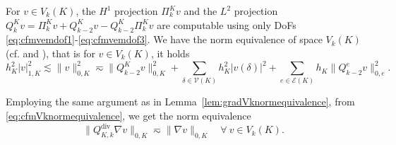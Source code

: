 \documentclass[10pt]{amsart}
\renewcommand{\div}{\operatorname{div}}
\numberwithin{equation}{section}
\begin{document}


For $v\in V_k(K)$, the $H^1$ projection $\Pi_k^Kv$ and the $L^2$ projection $Q_k^Kv= \Pi_k^Kv + Q_{k-2}^Kv-Q_{k-2}^K\Pi_k^Kv$ are computable using only DoFs \eqref{eq:cfmvemdof1}-\eqref{eq:cfmvemdof3}. 
We have the norm equivalence of space $V_k(K)$ (cf. \cite[Lemma 4.7]{Huang2021} and \cite{ChenHuang2018,BrennerSung2018,BeiraodaVeigaLovadinaRusso2017}), that is for $v\in V_k(K)$, it holds
\begin{equation}\label{eq:cfmVknormequivalence}
h_K^2|v|_{1,K}^2\lesssim\|v\|_{0,K}^2\eqsim \|Q_{k-2}^Kv\|_{0,K}^2 + \sum_{\delta\in \mathcal V(K)}h_K^2|v(\delta)|^2+\sum_{e\in\mathcal E(K)}h_K\|Q_{k-2}^ev\|_{0,e}^2.
\end{equation}

Employing the same argument as in Lemma~\ref{lem:gradVknormequivalence}, from  \eqref{eq:cfmVknormequivalence}, we get the norm equivalence
\begin{equation}\label{eq:cfmgradVknormequivalence}  
\|Q_{K,k}^{\div}\nabla v\|_{0,K}\eqsim \|\nabla v\|_{0,K} \quad \forall~v\in V_k(K).
\end{equation}
\end{document}
